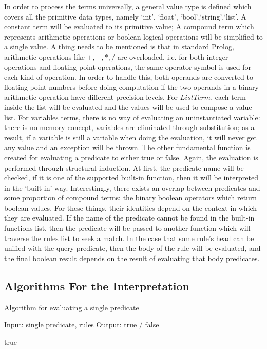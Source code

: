\documentclass[11pt,a4paper]{report}
\begin{document}
In order to process the terms universally, a general value type is defined which covers all the primitive data types, namely `int', `float', `bool',`string',`list'. A constant term will be evaluated to its primitive value; A compound term which represents arithmetic operations or boolean logical operations will be simplified to a single value. A thing needs to be mentioned is that in standard Prolog, arithmetic operations like $+,-,*,/$ are overloaded, i.e. for both integer operations and floating point operations, the same operator symbol is used for each kind of operation. In order to handle this, both operands are converted to floating point numbers before doing computation if the two operands in a binary arithmetic operation have different precision levels. For $ListTerm$, each term inside the list will be evaluated and the values will be used to compose a value list. For variables terms, there is no way of evaluating an uninstantiated variable: there is no memory concept, variables are eliminated through substitution; as a result, if a variable is still a variable when doing the evaluation, it will never get any value and an exception will be thrown.
\bigskip
The other fundamental function is created for evaluating a predicate to either true or false. Again, the evaluation is performed through structural induction. At first, the predicate name will be checked, if it is one of the supported built-in function, then it will be interpreted in the `built-in' way. Interestingly, there exists an overlap between predicates and some proportion of compound terms: the binary boolean operators which return boolean values. For these things, their identities depend on the context in which they are evaluated. If the name of the predicate cannot be found in the built-in functions list, then the predicate will be passed to another function which will traverse the rules list to seek a match. In the case that some rule's head can be unified with the query predicate, then the body of the rule will be evaluated, and the final boolean result depends on the result of evaluating that body predicates. 

\bigskip
\subsection*{Algorithms For the Interpretation}

\begin{algorithm}
	\caption{Algorithm for evaluating a single predicate}
	
	\begin{algorithmic}
		\State Input: single predicate, rules
		\State Output: true / false
		
			
			\State \Return true
		\EndFunction
		
	\end{algorithmic}
	
\end{algorithm}
\end{document}

